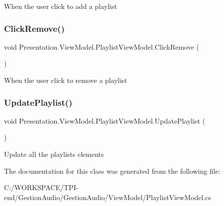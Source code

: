 When the user click to add a playlist 

\mbox{\label{class_presentation_1_1_view_model_1_1_playlist_view_model_aca79c8f84c21bfe3c1ab2cc48c1cc76f}} 
\subsubsection{\texorpdfstring{Click\+Remove()}{ClickRemove()}}
{\footnotesize\ttfamily void Presentation.\+View\+Model.\+Playlist\+View\+Model.\+Click\+Remove (\begin{DoxyParamCaption}{ }\end{DoxyParamCaption})}



When the user click to remove a playlist 

\mbox{\label{class_presentation_1_1_view_model_1_1_playlist_view_model_a251fc433a805e640e40769120160b645}} 
\subsubsection{\texorpdfstring{Update\+Playlist()}{UpdatePlaylist()}}
{\footnotesize\ttfamily void Presentation.\+View\+Model.\+Playlist\+View\+Model.\+Update\+Playlist (\begin{DoxyParamCaption}{ }\end{DoxyParamCaption})}



Update all the playlists elements 



The documentation for this class was generated from the following file\+:\begin{DoxyCompactItemize}
\item 
C\+:/\+W\+O\+R\+K\+S\+P\+A\+C\+E/\+T\+P\+I-\/end/\+Gestion\+Audio/\+Gestion\+Audio/\+View\+Model/Playlist\+View\+Model.\+cs\end{DoxyCompactItemize}
